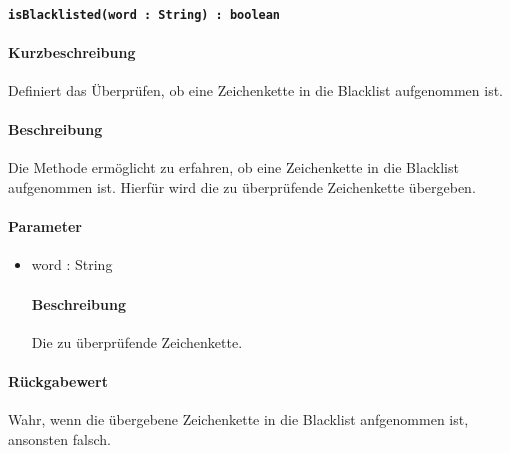 \paragraph{\texttt{isBlacklisted(word : String) : boolean}}%
\paragraph*{Kurzbeschreibung}
Definiert das Überprüfen, ob eine Zeichenkette in die Blacklist aufgenommen ist.
\paragraph*{Beschreibung}
Die Methode ermöglicht zu erfahren, ob eine Zeichenkette in die Blacklist aufgenommen ist.
Hierfür wird die zu überprüfende Zeichenkette übergeben.
\paragraph*{Parameter}
\begin{itemize}
    \item word : String
    		\paragraph*{Beschreibung}
    		Die zu überprüfende Zeichenkette.
\end{itemize}
\paragraph*{Rückgabewert}
Wahr, wenn die übergebene Zeichenkette in die Blacklist anfgenommen ist, ansonsten falsch.

